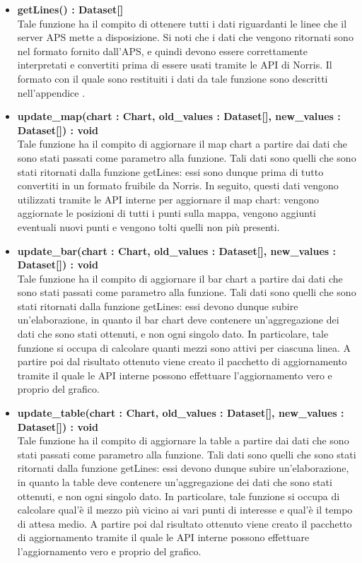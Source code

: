 \begin{itemize}
            \item \textbf{getLines() : Dataset[]} \\
            Tale funzione ha il compito di ottenere tutti i dati riguardanti le linee che il server APS mette a disposizione. Si noti che i dati che vengono ritornati sono nel formato fornito dall'APS, e quindi devono essere correttamente interpretati e convertiti prima di essere usati tramite le API di Norris. Il formato con il quale sono restituiti i dati da tale funzione sono descritti nell'appendice .
            
            \item \textbf{update\_map(chart : Chart, old\_values : Dataset[], new\_values : Dataset[]) : void} \\
            Tale funzione ha il compito di aggiornare il map chart a partire dai dati che sono stati passati come parametro alla funzione. Tali dati sono quelli che sono stati ritornati dalla funzione getLines: essi sono dunque prima di tutto convertiti in un formato fruibile da Norris. In seguito, questi dati vengono utilizzati tramite le API interne per aggiornare il map chart: vengono aggiornate le posizioni di tutti i punti sulla mappa, vengono aggiunti eventuali nuovi punti e vengono tolti quelli non più presenti.
            
            \item \textbf{update\_bar(chart : Chart, old\_values : Dataset[], new\_values : Dataset[]) : void} \\
            Tale funzione ha il compito di aggiornare il bar chart a partire dai dati che sono stati passati come parametro alla funzione. Tali dati sono quelli che sono stati ritornati dalla funzione getLines: essi devono dunque subire un'elaborazione, in quanto il bar chart deve contenere un'aggregazione dei dati che sono stati ottenuti, e non ogni singolo dato. In particolare, tale funzione si occupa di calcolare quanti mezzi sono attivi per ciascuna linea. A partire poi dal risultato ottenuto viene creato il pacchetto di aggiornamento tramite il quale le API interne possono effettuare l'aggiornamento vero e proprio del grafico.
            
            \item \textbf{update\_table(chart : Chart, old\_values : Dataset[], new\_values : Dataset[]) : void} \\
            Tale funzione ha il compito di aggiornare la table a partire dai dati che sono stati passati come parametro alla funzione. Tali dati sono quelli che sono stati ritornati dalla funzione getLines: essi devono dunque subire un'elaborazione, in quanto la table deve contenere un'aggregazione dei dati che sono stati ottenuti, e non ogni singolo dato. In particolare, tale funzione si occupa di calcolare qual'è il mezzo più vicino ai vari punti di interesse e qual'è il tempo di attesa medio. A partire poi dal risultato ottenuto viene creato il pacchetto di aggiornamento tramite il quale le API interne possono effettuare l'aggiornamento vero e proprio del grafico.

        \end{itemize}